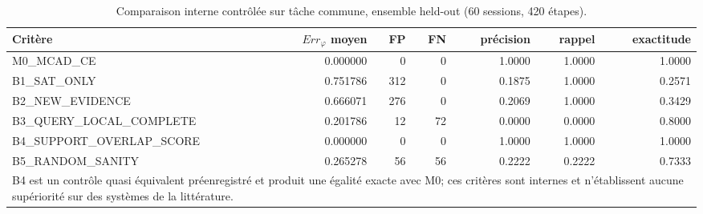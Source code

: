 \begin{table}[t]
\centering
\caption{Comparaison interne contrôlée sur tâche commune, ensemble held-out (60 sessions, 420 étapes).}
\label{tab:v88-common-task}
\small
\begin{tabular}{p{}rrrrrr}
\hline
Critère & $Err_\varphi$ moyen & FP & FN & précision & rappel & exactitude \\
\hline
M0\_MCAD\_CE & 0.000000 & 0 & 0 & 1.0000 & 1.0000 & 1.0000 \\
B1\_SAT\_ONLY & 0.751786 & 312 & 0 & 0.1875 & 1.0000 & 0.2571 \\
B2\_NEW\_EVIDENCE & 0.666071 & 276 & 0 & 0.2069 & 1.0000 & 0.3429 \\
B3\_QUERY\_LOCAL\_COMPLETE & 0.201786 & 12 & 72 & 0.0000 & 0.0000 & 0.8000 \\
B4\_SUPPORT\_OVERLAP\_SCORE & 0.000000 & 0 & 0 & 1.0000 & 1.0000 & 1.0000 \\
B5\_RANDOM\_SANITY & 0.265278 & 56 & 56 & 0.2222 & 0.2222 & 0.7333 \\
\hline
\multicolumn{7}{p{0.94\textwidth}}{\footnotesize B4 est un contrôle quasi équivalent préenregistré et produit une égalité exacte avec M0; ces critères sont internes et n'établissent aucune supériorité sur des systèmes de la littérature.}\\
\end{tabular}
\end{table}
